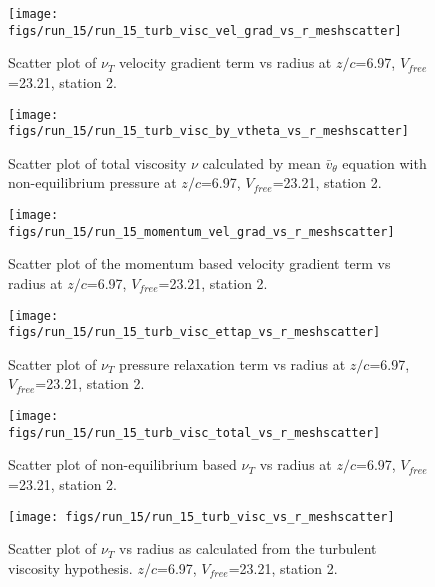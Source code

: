 \begin{figure}[H]
\centering
\texttt{[image: figs/run\_15/run\_15\_turb\_visc\_vel\_grad\_vs\_r\_meshscatter]}
\caption{Scatter plot of $\nu_T$ velocity gradient term vs radius at $z/c$=6.97, $V_{free}$=23.21, station 2.}
\end{figure}


\begin{figure}[H]
\centering
\texttt{[image: figs/run\_15/run\_15\_turb\_visc\_by\_vtheta\_vs\_r\_meshscatter]}
\caption{Scatter plot of total viscosity $\nu$ calculated by mean $\bar{v}_{\theta}$ equation with non-equilibrium pressure at $z/c$=6.97, $V_{free}$=23.21, station 2.}
\end{figure}


\begin{figure}[H]
\centering
\texttt{[image: figs/run\_15/run\_15\_momentum\_vel\_grad\_vs\_r\_meshscatter]}
\caption{Scatter plot of the momentum based velocity gradient term vs radius at $z/c$=6.97, $V_{free}$=23.21, station 2.}
\end{figure}


\begin{figure}[H]
\centering
\texttt{[image: figs/run\_15/run\_15\_turb\_visc\_ettap\_vs\_r\_meshscatter]}
\caption{Scatter plot of $\nu_T$ pressure relaxation term vs radius at $z/c$=6.97, $V_{free}$=23.21, station 2.}
\end{figure}


\begin{figure}[H]
\centering
\texttt{[image: figs/run\_15/run\_15\_turb\_visc\_total\_vs\_r\_meshscatter]}
\caption{Scatter plot of non-equilibrium based $\nu_T$ vs radius at $z/c$=6.97, $V_{free}$=23.21, station 2.}
\end{figure}


\begin{figure}[H]
\centering
\texttt{[image: figs/run\_15/run\_15\_turb\_visc\_vs\_r\_meshscatter]}
\caption{Scatter plot of $\nu_T$ vs radius as calculated from the turbulent viscosity hypothesis. $z/c$=6.97, $V_{free}$=23.21, station 2.}
\end{figure}


